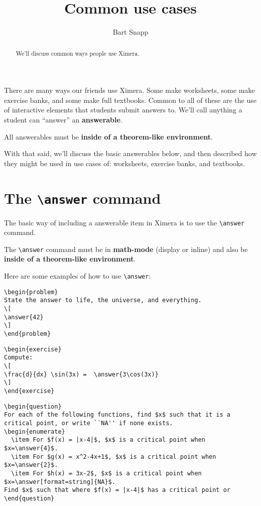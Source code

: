\documentclass{ximera}
\title{Common use cases}
\author{Bart Snapp}
\begin{document}
\begin{abstract}
  We'll discuss common ways people use Ximera.
\end{abstract}
\maketitle

There are many ways our friends use Ximera. Some make worksheets, some make
exercise banks, and some make full textbooks. Common to all of these are the
use of interactive elements that students submit answers to. We'll call
anything a student can ``answer'' an \textbf{answerable}.

\begin{warning}
  All answerables must be \textbf{inside of a theorem-like environment}.
\end{warning}

With that said, we'll discuss the basic answerables below, and then described
how they might be used in use cases of: worksheets, exercise banks, and
textbooks.

\section{The \texttt{\textbackslash answer} command}

The basic way of including a answerable item in Ximera is to use the
\verb|\answer| command.

\begin{warning}
  The \verb|\answer| command must be in \textbf{math-mode} (display or inline)
  and also be \textbf{inside of a
    theorem-like environment}.
\end{warning}
Here are some examples of how to use \verb!\answer!:

\begin{verbatim}
\begin{problem}
State the answer to life, the universe, and everything.
\[
\answer{42}
\]
\end{problem}
\end{verbatim}

\begin{verbatim}
\begin{exercise}
Compute:
\[
\frac{d}{dx} \sin(3x) =  \answer{3\cos(3x)}
\]
\end{exercise}
\end{verbatim}

\begin{verbatim}
\begin{question}
For each of the following functions, find $x$ such that it is a critical point, or write ``NA'' if none exists.
\begin{enumerate}
  \item For $f(x) = |x-4|$, $x$ is a critical point when $x=\answer{4}$.
  \item For $g(x) = x^2-4x+1$, $x$ is a critical point when $x=\answer{2}$.
  \item For $h(x) = 3x-2$, $x$ is a critical point when $x=\answer[format=string]{NA}$.
Find $x$ such that where $f(x) = |x-4|$ has a critical point or
\end{question}
\end{verbatim}
\end{document}
